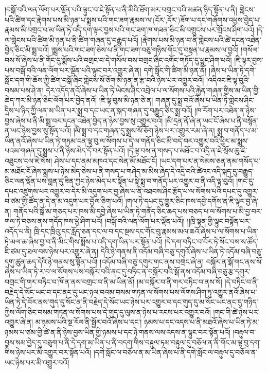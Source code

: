 །བསྒོ་བའི་ལན་ལོག་པར་ལྡོན་པའི་ལྟུང་བ་ཇེ་སྟོན་པ་ནི་མིའི་ཐོག་མར་བགྲང་བའི་མཚན་ཉིད་སྟོན་པ་ནི། གླེངས་པའི་ཚིག་དང་རྣེགས་པས་མི་ཉན་པ་སྨྲས་པའི་གང་ཟག་རྣམས་ལ་(ངོར་‚དོར་)ཟོག་པ་དང་གཞོགས་འཕྱས་བྱེད་པ་རྣམས་མི་བགྲང་བ་མ་ཡིན་ཏེ་འདི་དག་ལྟར་བྱས་པའི་གང་ཟག་ཁ་གཟན་ཅིང་མི་བགྲུངས་པར་གྲོངས་ཤིག་པའོ། །དེ་ལ་གླེངས་པའི་ཚིག་མི་ཉན་པ་ནི་ཚིག་གཞན་དུ་བརྒྱུད་པའོ། །རྣེགས་པས་མི་ཉན་བ་ནི་གླེངས་པའི་ཚེ་དངན་འཐེན་བྱེད་ཅིང་མི་སྨྲ་བའོ། །སྨྲས་པའི་གང་ཟག་ཅེས་པ་ནི་གང་ཟག་བཅུ་གཉིས་གོང་དུ་བསྟན་པ་རྣམས་ལ་བྱའོ། །གསོལ་བས་སོ་ཞེས་པ་ནི་གོང་དུ་སྨོས་པའི་བགྲང་བ་དེ་གསོལ་བས་བགྲང་ཞིང་འགོང་གཏོད་དུ་ཕྱུང་ཤིག་པའོ། །ཇི་ལྟར་བྱས་པས་བསྒོ་བའི་ལན་ལོག་པར་ལྡོན་པའི་ལྟུང་བར་འགྱུར་ཞེ་ན། དགེ་སློང་གི་ཚིག་མི་ཉན་ནོ། །ཞེས་པ་ཡིན་ཏེ་དགེ་སློང་དག་གི་ཆོས་ཀྱི་ཚིག་བསྒོ་ཞིང་གླེངས་སོ་ཅོག་མི་ཉན་ན་རྩ་བའི་ཉེས་པར་འགྱུར་བའོ། །འདིའང་ཇི་ལྟ་བུའི་བསམ་པས་ཤེ་ན། དེར་འདོད་ནའོ་ཞེས་པ་ཡིན་ཏེ་ཡེངས་ཤིང་འབྲེལ་པ་ལ་སོགས་པའི་རྐྱེན་གཞན་གྱིས་མ་ཡིན་གྱི་ཆེད་ཀར་མི་ཉན་ཅིང་ལོག་པར་བྱེད་ནའོ། །ཇི་ལྟ་བུས་མི་ཉན་ཅེ་ན། གཞན་དུ་སྨྲ་བའོ་ཞེས་པ་ཡིན་ཏེ་གླེངས་ཤིང་དྲིས་པ་ཉིད་ཀྱི་ལན་མ་ཡིན་པར་སྨྲ་བ་དང་ཡང་ན་སྐད་གཞན་དུ་བརྒྱུད་ཅིང་སྨྲ་བའོ། །ཁ་རོག་པར་འཐེན་ན་ཉེས་བྱས་ཞེས་པ་ནི་མི་སྨྲ་བར་དངན་འཐེན་བྱེད་ན་ཉེས་བྱས་སུ་འགྱུར་བའོ། །མི་དྲན་ནོ་ཞེ་ན་ཡང་ངོ་ཞེས་པ་ནི་བསྙོན་ན་ཡང་ཉེས་བྱས་སུ་སྟོན་པའོ། །མི་སྨྲ་བ་དང་གཞན་དུ་སྨྲས་སོ་ཅོག་ཉེས་པར་འགྱུར་རམ་ཞེ་ན། སྨྲ་བ་གནོད་པ་མ་ཡིན་ནའོ་ཞེས་པ་ཡིན་ཏེ་གཏམ་ངན་ལྟ་བུ་ལ་སོགས་པ་དེ་ལ་གནོད་ཅིང་མི་བདེ་བར་འགྱུར་བའི་ཕྱིར་མ་སྨྲས་པའམ་གཞན་དུ་སྨྲས་པ་ནི་ཉེས་མེད་དོ་བར་སྟོན་པའོ། །དེ་ལྟ་བས་ན་གསད་པ་མཐོང་བ་འདྲི་ན་ཇེ་སྲོས་ཆུ་ཇེ་འཐུངས་ངལ་ཇེ་སོས། ཤེས་པ་དང་ནམ་མཁའ་དང་སེན་མོ་མཐོང་ངོ། །ཡང་དག་པར་ན་སེམས་ཅན་ནམ་གསོད་པ་མ་མཐོང་ངོ་ཞེས་སྨྲས་པ་ཉེས་མེད་ཅེས་པ་ནི་གསད་པ་གཤེད་མ་མིས་ཞེད་དེ་འདྲི་བའི་ཚེའང་འདི་སྐད་དུ་བརྒྱུད་ཅིང་ལན་ལྡོན་པས་བླན་དུ་ཟིན་ཀྱང་ཉེས་མེད་པར་སྟོན་པ་སྟེ་སྨྲ་བ་གནོད་པར་འགྱུར་བ་ནི་འདི་ལྟ་བུའོ། །གང་དུ་དཔང་འཛུགས་པར་འགྱུར་བ་དེར་མི་འདུག་པར་བྱ་ཞེས་པ་ནི་འཐབས་ཤིང་རྩོད་པ་ལ་སོགས་པའི་དཔང་དུ་འགྱུར་བ་ཙམ་གྱི་ཚོད་ན་དེ་ན་མ་འདུག་པར་བྱོལ་ཅིག་པའོ། །གལ་ཏེ་དཔང་དུ་གྱུར་ཅིང་ཁས་དབྱེ་དགོས་ན་ཇི་ལྟར་བྱ་ཞེ་ན། གནོད་པའི་སྒོ་མ་གཅད་པར་ཁས་མི་དབྱེ་ཞེས་པ་ཡིན་ཏེ་གནོད་ཅིང་ཆད་པས་བཅད་པ་ལ་སོགས་པ་མི་བྱ་བར་གལ་ཏེ་བཅས་ནས་གདོད་ཁས་ཕྱེ་ཤིག་པའོ། །བསྒོ་བའི་ལན་ལོག་པར་ལྡོན་པའོ།། །།ཁྲི་སྟན་གྱི་ལྟུང་བསྟོན་པར་འདོད་པ་ནི། ཁྲི་དང་ཁྲིའུ་དང་རློད་ཅན་དང་ལ་བ་དང་སྔས་དང་གོང་བུ་རྣམས་མལ་ཆའོ་ཞེས་པ་ལ་སོགས་པ་ཡིན་ཏེ་མལ་ཆ་ཞེས་བྱ་བ་ནི་མིང་གིས་སྨོས་པ་འདི་དག་ཡིན་པར་སྟོན་པའོ། །དེ་དག་བཏིང་བ་བོར་ཏེ་སོང་བས་ས་ཚོད་ཇི་ཙམ་དུ་ཐལ་བས་ཉེས་པར་འགྱུར་ཞེ་ན། དེའི་ཉེ་གནས་ནི་འདོམ་བཞི་བཅུ་དགུའོ་ཞེས་པ་ཡིན་ཏེ་འདོམ་བཞི་བཅུ་དགུ་ཚུན་ཆད་དེའི་ཉེ་གནས་སུ་སྟོན་པའོ། །འདོམ་བཞི་བཅུ་དགུར་གང་ནས་བགྲང་ཞེ་ན། བསྐོར་ན་སྒོ་གང་ནས་སོ་ཞེས་པ་ཡིན་ཏེ་ར་བ་ལ་སོགས་པས་བསྐོར་བའི་ནང་དུ་བཏིང་ན་བསྐོར་བའི་སྒོ་ནས་འདོམ་བཞི་བཅུ་རྩ་དགུར་བགྲང་གི་གར་བཏིང་བ་ཁོ་ན་ནས་བགྲང་བ་ནི་མ་ཡིན་ནོ། །མ་བསྐོར་བ་ནི་གར་བཏིང་བ་ནས་སོ། །དེ་བཏིང་བ་ནི་བརྗེད་དེ་སོང་ཡང་བ་དང་ནང་དུ་ཡང་ཉལ་བའམ་བསམ་གཏན་ལ་སོགས་པས་ལོགས་ཤིག་ཏུ་འགྱུར་ནའོ་ཞེས་པ་ཡིན་ཏེ་དེ་བོར་ནས་གུད་དུ་སོང་ན་ནི་བརྗེད་དེ་སོང་ཡང་ཉེས་པར་འགྱུར་བ་དང་གུད་དུ་མ་སོང་ཡང་ནང་དུ་གཉིད་ཀྱིས་ལོག་ཅིང་བསམ་གཏན་ལ་སོགས་པས་དེ་གུད་དུ་ལུས་ན་ཉེས་པ་རངས་པར་འགྱུར་བའོ། །གང་གི་ཚེ་ཉེས་པར་འགྱུར་ཞེ་ན། མ་ཉམས་པའི་སྔ་རོལ་ནི་སྦྱོར་བའོ་ཞེས་པ་དང་། ཉམས་པ་དང་འདས་པ་ནི་མཐའོ་ཞེས་པ་ཡིན་ཏེ་མ་ཉམས་པ་ཙམ་གྱི་ཚེ་ན་ནི་ཉེས་བྱས་ཡིན་གྱི་ཉམས་པ་དང་ཉེ་གནས་ལས་འདས་ན་ལྟུང་བར་སྟོན་པའོ། །བརྟུལ་བ་བྱས་སམ་བྱེད་དུ་བཅུག་པ་ནི་དེ་དག་མ་ཡིན་པ་ནི་བདག་གིས་བརྟུལ་ཏམ་བརྟུལ་དུ་བཅོལ་ན་ནི་གོང་མ་ལྟ་བུ་དག་གིས་ཉེས་པར་མི་འགྱུར་བར་སྟོན་པའོ། །དགེ་སློང་ལ་བཅོལ་ན་མ་ཡིན་ཞེས་པ་ནི་དགེ་སློང་ལ་བརྟུལ་དུ་བཅོལ་ན་ཡང་ཉེས་པར་མི་འགྱུར་བའོ། 